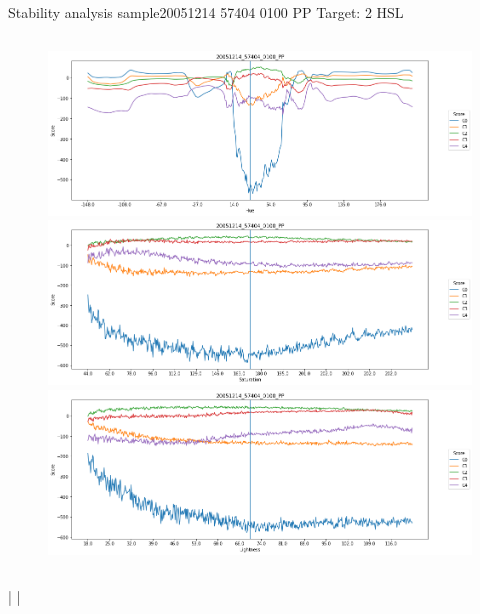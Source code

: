 \documentclass{beamer}
\begin{document}
\begin{frame}{Stability analysis sample}{20051214 57404 0100 PP Target: 2 HSL}
\begin{columns}
\begin{column}{0.45\textwidth}
\begin{figure}[p]
			\includegraphics[width=\textwidth]{chapter_stability/20051214_57404_0100_PP/h/scores.png}			\includegraphics[width=\textwidth]{chapter_stability/20051214_57404_0100_PP/s/scores.png}			\includegraphics[width=\textwidth]{chapter_stability/20051214_57404_0100_PP/l/scores.png}
		\end{figure}
	\end{column}
\end{columns}
\href{run:videos_stability/Messidor_20051214_57404_0100_PP_Target_2_Checking_Hue_Sensitivity.mp4}{\color{blue}{Hue}} | \href{run:videos_stability/Messidor_20051214_57404_0100_PP_Target_2_Checking_Saturation_Sensitivity.mp4}{\color{blue}{Saturation}} | \href{run:videos_stability/Messidor_20051214_57404_0100_PP_Target_2_Checking_Luminance_Sensitivity.mp4}{\color{blue}{Lightness}}
\end{frame}
\end{document}
